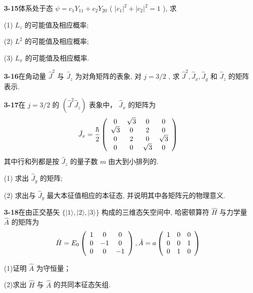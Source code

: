 \vfill

\newpage
\vfill

\noindent
\textbf{3-15}\quad 体系处于态 $\psi = c_{1}Y_{11} + c_{2}Y_{20}$ ( $|c_1|^2 + |c_2|^2 = 1$ ), 求

(1) $L_{z}$ 的可能值及相应概率; 

(2) $L^{2}$ 的可能值及相应概率; 

(3) $L_{x}$ 的可能值及相应概率.


\vfill

\newpage
\vfill

\noindent
\textbf{3-16}\quad 在角动量 $\hat{J}^2$ 与 $\hat{J}_z$ 为对角矩阵的表象, 对 $j = 3 / 2$ , 求 $\hat{J}^2, \hat{J}_x, \hat{J}_y$ 和 $\hat{J}_z$ 的矩阵表示.

\vfill

\newpage
\vfill

\noindent
\textbf{3-17}\quad 在 $j = 3 / 2$ 的 $(\hat{J}^2\hat{J}_z)$ 表象中， $\hat{J}_x$ 的矩阵为
$$
\hat {J} _ {x} = \frac {\hbar}{2} \left( \begin{array}{c c c c} 0 & \sqrt {3} & 0 & 0 \\ \sqrt {3} & 0 & 2 & 0 \\ 0 & 2 & 0 & \sqrt {3} \\ 0 & 0 & \sqrt {3} & 0 \end{array} \right)
$$
其中行和列都是按 $\hat{J}_z$ 的量子数 $m$ 由大到小排列的. 

(1) 求出 $\hat{J}_y$ 的矩阵; 

(2) 求出与 $\hat{J}_y$ 最大本征值相应的本征态, 并说明其中各矩阵元的物理意义.

\vfill

\newpage
\vfill

\noindent
\textbf{3-18}\quad 在由正交基矢 $\{|1\rangle, |2\rangle, |3\rangle\}$ 构成的三维态矢空间中, 哈密顿算符 $\hat{H}$ 与力学量 $\hat{A}$ 的矩阵为
$$
\hat {H} = E _ {0} \left( \begin{array}{c c c} 1 & 0 & 0 \\ 0 & - 1 & 0 \\ 0 & 0 & - 1 \end{array} \right), \hat {A} = a \left( \begin{array}{c c c} 1 & 0 & 0 \\ 0 & 0 & 1 \\ 0 & 1 & 0 \end{array} \right)
$$

(1)证明 $\hat{A}$ 为守恒量；

(2)求出 $\hat{H}$ 与 $\hat{A}$ 的共同本征态矢组.

